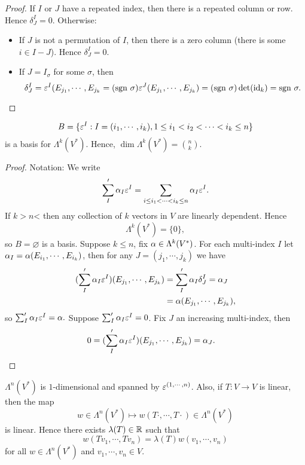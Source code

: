 \begin{proof}
    If $I$ or $J$ have a repeated index, then there is a repeated column or row. Hence $\delta_J^I = 0$. Otherwise:
    \begin{itemize}
    \item If $J$ is not a permutation of $I$, then there is a zero column (there is some $i \in I-J$). Hence $\delta_J^I = 0$.
    \item If $J = I_\sigma$ for some $\sigma$, then $$\delta_J^I = \varepsilon^I(E_{j_1},\cdots,E_{j_k} = (\mathrm{sgn~} \sigma) \varepsilon^J (E_{j_1}, \cdots, E_{j_k}) = (\mathrm{sgn~} \sigma)\det (\mathrm{id}_k) = \mathrm{sgn~} \sigma.$$
    \end{itemize}
\end{proof}
\begin{proposition}\label{14.8}
    $$B = \{\varepsilon^I: I = (i_1,\cdots,i_k), 1 \leq i_1<i_2<\cdots<i_k \leq n \}$$ is a basis for $\Lambda^k(V^*)$. Hence, $\dim \Lambda^k(V^*) = \binom{n}{k}$.
\end{proposition}
\begin{proof}
    Notation: We write 
    $$\sum_{I} '\alpha_I \varepsilon^I = \sum_{i \leq i_1<\cdots<i_k \leq n} \alpha_I \varepsilon^I.$$ If $k>n$< then any collection of $k$ vectors in $V$ are linearly dependent. Hence 
    $$\Lambda^k(V^*) = \{0\},$$ so $B = \varnothing$ is a basis. Suppose $k \leq n$, fix $\alpha \in \Lambda^k(V^*)$. For each multi-index $I$ let $\alpha_I = \alpha(E_{i_1},\cdots,E_{i_k})$, then for any $J = (j_1,\cdots,j_k)$ we have 
    \begin{align*}
    (\sum_I'\alpha_I \varepsilon^I)(E_{j_1},\cdots,E_{j_k})
    &= \sum_I'\alpha_I \delta_J^I = \alpha_J \\
    &= \alpha(E_{j_1},\cdots,E_{j_k}),
    \end{align*}
    so $\sum_I'\alpha_I \varepsilon^I = \alpha. $
    Suppose $\sum_I'\alpha_I\varepsilon^I = 0$. Fix $J$ an increasing multi-index, then 
    \begin{align*}
    0 &= (\sum_I'\alpha_I\varepsilon^I)(E_{j_1},\cdots,E_{j_k}) = \alpha_J. 
    \end{align*}
\end{proof}
\begin{example}
    $\Lambda^n(V^*)$ is $1$-dimensional and spanned by $\varepsilon^{(1,\cdots,n)}$. Also, if $T:V\to V$ is linear, then the map 
    $$w \in \Lambda^n(V^*) \mapsto w(T\cdot,\cdots,T\cdot) \in \Lambda^n(V^*)$$ is linear. Hence there exists $\lambda(T) \in \mathbb{R}$ such that $$w(Tv_1,\cdots,Tv_n) = \lambda(T)w(v_1,\cdots,v_n)$$ for all $w \in \Lambda^n(V^*)$ and $v_1,\cdots,v_n \in V$. 
\end{example}
